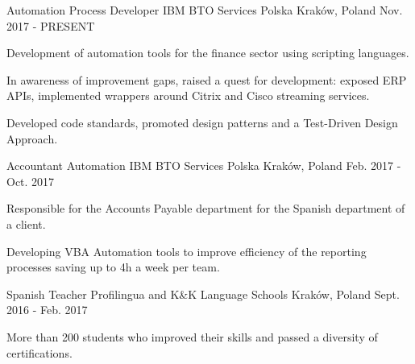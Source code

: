 

\begin{cventries}

  \cventry
    {Automation Process Developer} %
    {IBM BTO Services Polska} %
    {Kraków, Poland} %
    {Nov. 2017 - PRESENT} %
    {
      \begin{cvitems} %
        \item {Development of automation tools for the finance sector using scripting languages.}
        \item {In awareness of improvement gaps, raised a quest for development: exposed ERP APIs, implemented wrappers around Citrix and Cisco streaming services.}
        \item {Developed code standards, promoted design patterns and a Test-Driven Design Approach.}
      \end{cvitems}
    }

  \cventry
    {Accountant Automation} %
    {IBM BTO Services Polska} %
	{Kraków, Poland} %
	{Feb. 2017 - Oct. 2017} %
    {
      \begin{cvitems} %
        \item {Responsible for the Accounts Payable department for the Spanish department of a client.}
        \item {Developing VBA Automation tools to improve efficiency of the reporting processes saving up to 4h a week per team.}
      \end{cvitems}
    }

  \cventry
    {Spanish Teacher} %
    {Profilingua and K\&K Language Schools} %
	{Kraków, Poland} %
	{Sept. 2016 - Feb. 2017} %
    {
      \begin{cvitems} %
        \item {More than 200 students who improved their skills and passed a diversity of certifications.}
      \end{cvitems}
    }

\end{cventries}
